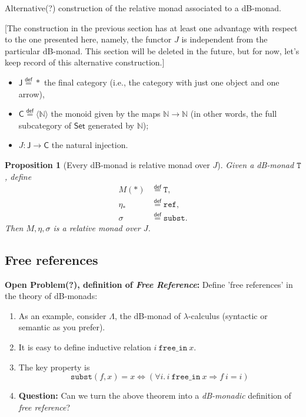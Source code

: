 \documentclass[a4paper,twoside,12pt]{article}
\newtheorem{proposition}{Proposition}
\theoremstyle{definition}
\theoremstyle{remark}
\newcommand{\NN}{\mathbb{N}}
\newcommand{\subst}{\mathtt{subst}}
\newcommand{\refe}{\mathtt{ref}}
\newcommand{\TT}{\mathtt{T}}
\begin{document}
Alternative(?) construction of the relative monad associated to a
dB-monad.

[The construction in the previous section has at least one advantage
with respect to the one presented here, namely, the functor $J$ is
independent from the particular dB-monad.  This section will be
deleted in the future, but for now, let's keep record of this
alternative construction.]

\begin{itemize}
\item $\mathsf{J}\stackrel{\mathsf{def}}{=}*$ the final category
  (i.e., the category with just one object and one arrow),
\item $\mathsf{C}\stackrel{\mathsf{def}}{=}\langle\NN\rangle$ the
  monoid given by the maps $\NN\to\NN$ (in other words, the full
  subcategory of $\mathsf{Set}$ generated by $\NN$);
\item $J\colon \mathsf{J} \to \mathsf{C}$ the natural injection.
\end{itemize}

\begin{proposition}[Every dB-monad is relative monad over $J$]
  Given a dB-monad $\TT$, define
  \begin{align*}
    M(*) &\stackrel{\mathsf{def}}{=} \TT, \\
    \eta_* &\stackrel{\mathsf{def}}{=} \refe, \\
    \sigma &\stackrel{\mathsf{def}}{=} \subst.
  \end{align*}
  Then $M,\eta,\sigma$ is a relative monad over $J$.
\end{proposition}

\subsection{Free references}
\label{sec:free-references}

\textbf{Open Problem(?), definition of \emph{Free Reference}:}
Define 'free references' in the theory of dB-monads:
\begin{enumerate}
\item As an example, consider $\Lambda$, the dB-monad of
  $\lambda$-calculus (syntactic or semantic as you prefer).
\item It is easy to define inductive relation
  $i\ \mathtt{free\_in}\ x$.
\item The key property is
  \begin{equation*}
    \subst(f,x) = x \Longleftrightarrow
    (\forall i.\, i\ \mathtt{free\_in}\ x \Longrightarrow f\ i = i)
  \end{equation*}
\item \textbf{Question:} Can we turn the above theorem into a
  \emph{dB-monadic} definition of \emph{free reference}?
\end{enumerate}
\end{document}
